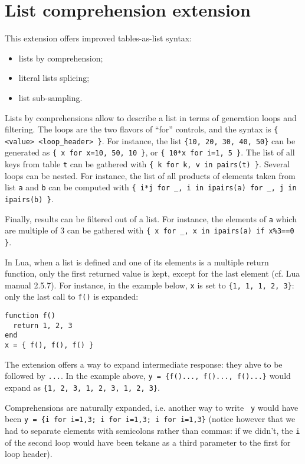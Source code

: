 \section{List comprehension extension} 

This extension offers improved tables-as-list syntax:
\begin{itemize}
\item lists by comprehension;
\item literal lists splicing;
\item list sub-sampling.
\end{itemize}

Lists by comprehensions allow to describe a list in terms of
generation loops and filtering. The loops are the two flavors of
``for'' controls, and the syntax is {\tt\{ <value> <loop\_header>
  \}}. For instance, the list {\tt\{10, 20, 30, 40, 50\}} can be generated
as {\tt\{ x for x=10, 50, 10 \}}, or {\tt\{ 10*x for i=1, 5 \}}. The
list of all keys from table {\tt t} can be gathered with {\tt\{ k for
  k, v in pairs(t) \}}. Several loops can be nested. For instance, the
list of all products of elements taken from list {\tt a} and {\tt b}
can be computed with {\tt\{ i*j for \_, i in ipairs(a) for \_, j in
  ipairs(b) \}}.

Finally, results can be filtered out of a list. For instance, the
elements of {\tt a} which are multiple of 3 can be gathered with
{\tt\{ x for \_, x in ipairs(a) if x\%3==0 \}}.

In Lua, when a list is defined and one of its elements is a multiple
return function, only the first returned value is kept, except for the
last element (cf. Lua manual 2.5.7). For instance, in the example
below, {\tt x} is set to {\tt\{1, 1, 1, 2, 3\}}: only the last call to
{\tt f()} is expanded:

\begin{verbatim}
function f()
  return 1, 2, 3
end
x = { f(), f(), f() }
\end{verbatim}

The extension offers a way to expand intermediate response: they ahve
to be followed by {\tt...}. In the example above, {\tt y = \{f()...,
  f()..., f()...\}} would expand as {\tt\{1, 2, 3, 1, 2, 3, 1, 2,
  3\}}.

Comprehensions are naturally expanded, i.e. another way to write {\tt
  y} would have been {\tt y = \{i for i=1,3; i for i=1,3; i for
  i=1,3\}} (notice however that we had to separate elements with
semicolons rather than commas: if we didn't, the {\tt i} of the second
loop would have been tekane as a third parameter to the first for loop
header).

